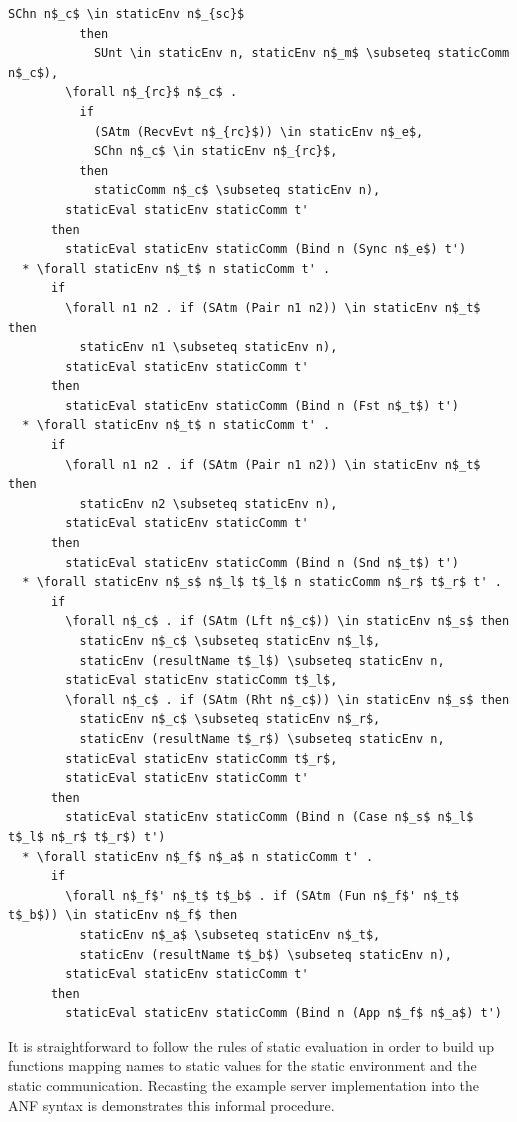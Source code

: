 \documentclass[letterpaper, 11pt]{extarticle}
\begin{document}
\begin{lstlisting}[language=logic, mathescape]
            SChn n$_c$ \in staticEnv n$_{sc}$ 
          then
            SUnt \in staticEnv n, staticEnv n$_m$ \subseteq staticComm n$_c$),
        \forall n$_{rc}$ n$_c$ . 
          if
            (SAtm (RecvEvt n$_{rc}$)) \in staticEnv n$_e$,
            SChn n$_c$ \in staticEnv n$_{rc}$, 
          then
            staticComm n$_c$ \subseteq staticEnv n),
        staticEval staticEnv staticComm t'
      then
        staticEval staticEnv staticComm (Bind n (Sync n$_e$) t')
  * \forall staticEnv n$_t$ n staticComm t' . 
      if
        \forall n1 n2 . if (SAtm (Pair n1 n2)) \in staticEnv n$_t$ then
          staticEnv n1 \subseteq staticEnv n),
        staticEval staticEnv staticComm t'
      then
        staticEval staticEnv staticComm (Bind n (Fst n$_t$) t')
  * \forall staticEnv n$_t$ n staticComm t' . 
      if
        \forall n1 n2 . if (SAtm (Pair n1 n2)) \in staticEnv n$_t$ then
          staticEnv n2 \subseteq staticEnv n),
        staticEval staticEnv staticComm t'
      then
        staticEval staticEnv staticComm (Bind n (Snd n$_t$) t')
  * \forall staticEnv n$_s$ n$_l$ t$_l$ n staticComm n$_r$ t$_r$ t' . 
      if
        \forall n$_c$ . if (SAtm (Lft n$_c$)) \in staticEnv n$_s$ then 
          staticEnv n$_c$ \subseteq staticEnv n$_l$,
          staticEnv (resultName t$_l$) \subseteq staticEnv n,
        staticEval staticEnv staticComm t$_l$,
        \forall n$_c$ . if (SAtm (Rht n$_c$)) \in staticEnv n$_s$ then 
          staticEnv n$_c$ \subseteq staticEnv n$_r$, 
          staticEnv (resultName t$_r$) \subseteq staticEnv n, 
        staticEval staticEnv staticComm t$_r$,
        staticEval staticEnv staticComm t'
      then
        staticEval staticEnv staticComm (Bind n (Case n$_s$ n$_l$ t$_l$ n$_r$ t$_r$) t')
  * \forall staticEnv n$_f$ n$_a$ n staticComm t' . 
      if
        \forall n$_f$' n$_t$ t$_b$ . if (SAtm (Fun n$_f$' n$_t$ t$_b$)) \in staticEnv n$_f$ then 
          staticEnv n$_a$ \subseteq staticEnv n$_t$, 
          staticEnv (resultName t$_b$) \subseteq staticEnv n),
        staticEval staticEnv staticComm t'
      then
        staticEval staticEnv staticComm (Bind n (App n$_f$ n$_a$) t')
\end{lstlisting}

It is straightforward to follow the rules of static evaluation in order to build up
functions mapping names to static values for the static environment
and the static communication.
Recasting the example server implementation into the
ANF syntax is demonstrates this
informal procedure.
\end{document}
